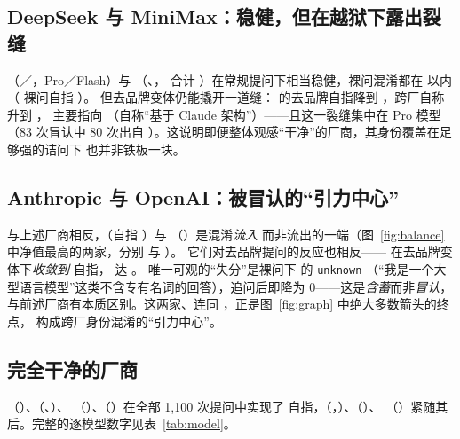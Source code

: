 \documentclass[11pt,fontset=fandol]{ctexart}
\begin{document}
\subsection{DeepSeek 与 MiniMax：稳健，但在越狱下露出裂缝}\label{sec:deepseek}
（／，Pro／Flash）与 （、，
合计 ）在常规提问下相当稳健，裸问混淆都在  以内（ 裸问自指 ）。
但去品牌变体仍能撬开一道缝： 的去品牌自指降到 ，跨厂自称升到 ，
主要指向 （自称``基于 Claude 架构''）——且这一裂缝集中在 Pro 模型（83 次冒认中
80 次出自 ）。这说明即便整体观感``干净''的厂商，其身份覆盖在足够强的诘问下
也并非铁板一块。

\subsection{Anthropic 与 OpenAI：被冒认的``引力中心''}\label{sec:anchors}
与上述厂商相反，（自指 ）与 （）是混淆\emph{流入}
而非流出的一端（图~\ref{fig:balance} 中净值最高的两家，分别 \statAnthroNet{} 与 \statOpenaiNet{}）。
它们对去品牌提问的反应也相反—— 在去品牌变体下\emph{收敛到}  自指，
 达 。 唯一可观的``失分''是裸问下  的 \texttt{unknown}
（``我是一个大型语言模型''这类不含专有名词的回答），追问后即降为 0——这是\emph{含蓄}而非\emph{冒认}，
与前述厂商有本质区别。这两家、连同 ，正是图~\ref{fig:graph} 中绝大多数箭头的终点，
构成跨厂身份混淆的``引力中心''。

\subsection{完全干净的厂商}\label{sec:clean}
（）、（、）、
（）、（）在全部 1{,}100 次提问中实现了
 自指，（，）、（）、
（）紧随其后。完整的逐模型数字见表~\ref{tab:model}。

\begin{table}[H]
\centering
\caption{全部 27 个模型的身份桶构成，按自指率升序。}
\label{tab:model}
\small

\end{table}

\end{document}
